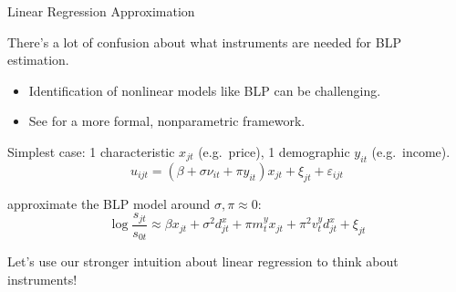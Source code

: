 \documentclass[aspectratio=169,t,11pt,table]{beamer}
\begin{document}
\begin{frame}{Linear Regression Approximation}
    \begin{wideitemize}
        \item There's a lot of confusion about what instruments are needed for BLP estimation.
        \begin{itemize}
            \item Identification of nonlinear models like BLP can be challenging.
            \item See \cite{berry2014identification,berry2023nonparametric} for a more formal, nonparametric framework.
        \end{itemize}
        \pause
        \item Simplest case: 1 characteristic $x_{jt}$ (e.g.\ price), 1 demographic $y_{it}$ (e.g.\ income).
        \begin{equation*}
            u_{ijt} = (\beta + \sigma \nu_{it} + \pi y_{it}) x_{jt} + \xi_{jt} + \varepsilon_{ijt} 
        \end{equation*}
        \vspace{-1.5\baselineskip}
        \pause
        \item \cite{salanie2022fast} approximate the BLP model around $\sigma, \pi \approx 0$:
        \begin{equation*}
            \log\frac{s_{jt}}{s_{0t}} \approx \beta x_{jt} + \sigma^2 d_{jt}^x + \pi m_t^y x_{jt} + \pi^2 v_t^y d_{jt}^x + \xi_{jt}
        \end{equation*}
        \vspace{-1.5\baselineskip}
        \pause
        \item Let's use our stronger intuition about linear regression to think about instruments!
    \end{wideitemize}
\end{frame}
\end{document}
